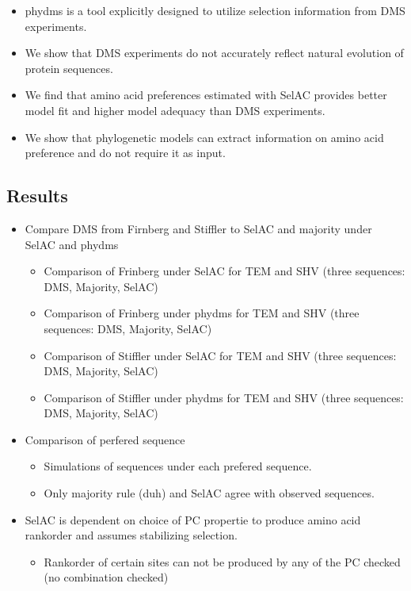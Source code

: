 \documentclass[12pt]{article}
\begin{document}
\begin{itemize}
	\item phydms is a tool explicitly designed to utilize selection information from DMS experiments.
	\item We show that DMS experiments do not accurately reflect natural evolution of protein sequences.
	\item We find that amino acid preferences estimated with SelAC provides better model fit and higher model adequacy than DMS experiments.
	\item We show that phylogenetic models can extract information on amino acid preference and do not require it as input.
\end{itemize}

\subsection*{Results}
\begin{itemize}
	\item Compare DMS from Firnberg and Stiffler to SelAC and majority under SelAC and phydms
	\begin{itemize}
		\item Comparison of Frinberg under SelAC for TEM and SHV (three sequences: DMS, Majority, SelAC)
		\item Comparison of Frinberg under phydms for TEM and SHV (three sequences: DMS, Majority, SelAC)
		\item Comparison of Stiffler under SelAC for TEM and SHV (three sequences: DMS, Majority, SelAC)
		\item Comparison of Stiffler under phydms for TEM and SHV (three sequences: DMS, Majority, SelAC)
	\end{itemize}
	\item Comparison of perfered sequence
	\begin{itemize}
		\item Simulations of sequences under each prefered sequence.
		\item Only majority rule (duh) and SelAC agree with observed sequences. 
	\end{itemize} 
	\item SelAC is dependent on choice of PC propertie to produce amino acid rankorder and assumes stabilizing selection. 
	\begin{itemize}
		\item Rankorder of certain sites can not be produced by any of the PC checked (no combination checked)
	\end{itemize}
\end{itemize}
\end{document}
